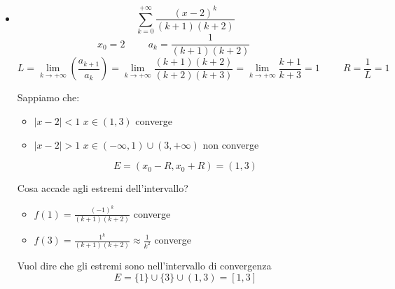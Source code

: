 \begin{example}
     \begin{itemize}
         \item \begin{equation*}
             \sum^{+\infty}_{k=0}\frac{(x-2)^k}{(k+1)(k+2)}
         \end{equation*}
         \begin{equation*}
            x_0=2\hspace{1cm}a_k=\frac{1}{(k+1)(k+2)}\hspace{1cm}
         \end{equation*}
         \begin{equation*}
             L=\lim_{k\to+\infty}(\frac{a_{k+1}}{a_k})=\lim_{k\to+\infty}\frac{(k+1)(k+2)}{(k+2)(k+3)}=\lim_{k\to+\infty}\frac{k+1}{k+3}=1\hspace{1cm}R=\frac{1}{L}=1
         \end{equation*}
         
         Sappiamo che:
         \begin{itemize}
             \item[] $|x-2|<1$ $x\in(1,3)$ converge
             \item[] $|x-2|>1$ $x\in(-\infty,1)\cup(3,+\infty)$ non converge
         \end{itemize}
         
         \begin{equation*}E=(x_0-R,x_0+R)=(1,3)\end{equation*}
         
         Cosa accade agli estremi dell'intervallo?\\
         \begin{itemize}
             \item[] $f(1)=\frac{(-1)^k}{(k+1)(k+2)}$ converge
             \item[] $f(3)=\frac{1^k}{(k+1)(k+2)}\approx\frac{1}{k^2}$ converge
         \end{itemize}
         
         Vuol dire che gli estremi sono nell'intervallo di convergenza
         \begin{equation*}E=\{1\}\cup\{3\}\cup(1,3)=[1,3]\end{equation*}
         

\end{itemize}
\end{example}
